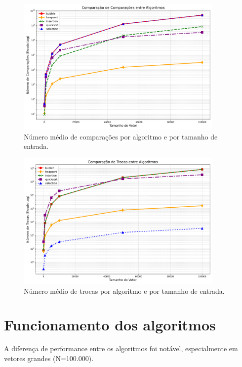 \documentclass[a4paper]{article}
\begin{document}
    \begin{figure}[htbp]
      \centering
      \includegraphics[width=0.9\textwidth]{../../graficos/comparacoes_comparacao}
      \caption{Número médio de comparações por algoritmo e por tamanho de entrada.}
      \label{fig:comparacoes_comparacao}
    \end{figure}

    \begin{figure}[htbp]
      \centering
      \includegraphics[width=0.9\textwidth]{../../graficos/trocas_comparacao}
      \caption{Número médio de trocas por algoritmo e por tamanho de entrada.}
      \label{fig:trocas_comparacao}
    \end{figure}

    \section{Funcionamento dos algoritmos}\label{sec:funcionamento-dos-algoritmos}

    A diferença de performance entre os algoritmos foi notável, especialmente em vetores grandes (N=100.000).
\end{document}
